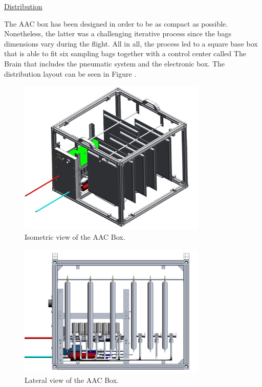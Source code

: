 \bigskip
\underline{Distribution}

The AAC box has been designed in order to be as compact as possible. Nonetheless, the latter was a challenging iterative process since the bags dimensions vary during the flight. All in all, the process led to a square base box that is able to fit six sampling bags together with a control center called The Brain that includes the pneumatic system and the electronic box. The distribution layout can be seen in Figure .


\begin{figure}[H]
    \centering
    \includegraphics[width=0.8\textwidth]{4-experiment-design/img/Mechanical/AAC_isometric_view.png}
    \caption{Isometric view of the AAC Box.}
    \label{iso_aac}
\end{figure}


\begin{figure}[H]
    \centering
    \includegraphics[width=0.8\textwidth]{4-experiment-design/img/Mechanical/AAC_lateral_view.png}
    \caption{Lateral view of the AAC Box.}
    \label{lateral_aac}
\end{figure}

